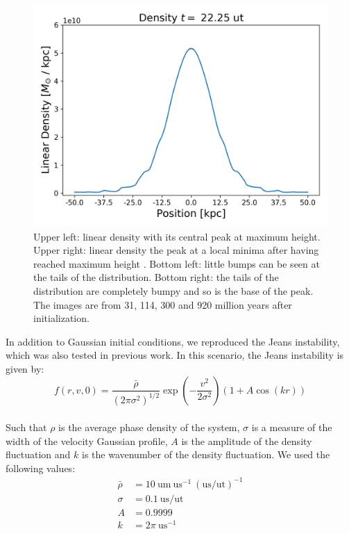 \begin{figure}[h!]
    \includegraphics[scale=0.45]{imag/gaussD89.png}
    \caption{Upper left: linear density with its central peak at maximum height. Upper right: linear density the peak at a local minima after having reached maximum height . Bottom left: little bumps can be seen at the tails of the distribution. Bottom right: the tails of the distribution are completely bumpy and so is the base of the peak. The images are from 31, 114, 300 and 920 million years after initialization.  }
    \label{1dDens}
\end{figure}

In addition to Gaussian initial conditions, we reproduced the Jeans instability, which was also tested in previous work. In this scenario, the Jeans instability is given by:
\begin{equation}
f(r,v,0) = \frac{\bar{\rho}}{(2 \pi \sigma^2)^{1/2}} \exp(-\frac{v^2}{2 \sigma^2}) (1 + A \cos(kr))
\end{equation}\\
Such that $\rho$ is the average phase density of the system, $\sigma$ is a measure of the width of the velocity Gaussian profile, $A$ is the amplitude of the density fluctuation and $k$ is the wavenumber of the density fluctuation. We used the following values:
\begin{align}
\bar{\rho} &= 10 \  \text{um} \ \text{us}^{-1} \ (\text{us/ut})^{-1} \\
\sigma &= 0.1 \ \text{us/ut} \\
A &= 0.9999 \\
k &= 2 \pi \ \text{us}^{-1}
\end{align}

